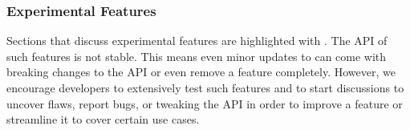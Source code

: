 \subsubsection{Experimental Features}

Sections that discuss experimental features are highlighted with \experimental. The API of such features is not stable. This means even minor updates to \lib can come with breaking changes to the API or even remove a feature completely. However, we encourage developers to extensively test such features and to start discussions to uncover flaws, report bugs, or tweaking the API in order to improve a feature or streamline it to cover certain use cases.
